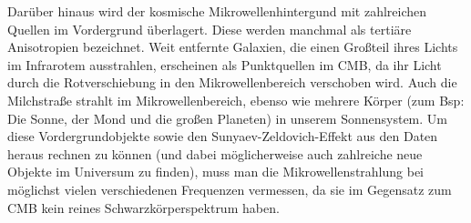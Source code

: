 \documentclass[10pt,a4paper]{article}
\begin{document}
Darüber hinaus wird der kosmische Mikrowellenhintergund mit zahlreichen Quellen im Vordergrund überlagert. Diese werden manchmal als tertiäre Anisotropien bezeichnet.\cite{Tegmark}
Weit entfernte Galaxien, die einen Großteil ihres Lichts im Infrarotem ausstrahlen, erscheinen als Punktquellen im CMB, da ihr Licht durch die Rotverschiebung in den Mikrowellenbereich verschoben wird. Auch die Milchstraße strahlt im Mikrowellenbereich, ebenso wie mehrere Körper (zum Bsp: Die Sonne, der Mond und die großen Planeten) in unserem Sonnensystem.
Um diese Vordergrundobjekte sowie den Sunyaev-Zeldovich-Effekt aus den Daten heraus rechnen zu können (und dabei möglicherweise auch zahlreiche neue Objekte im Universum zu finden), muss man die Mikrowellenstrahlung bei möglichst vielen verschiedenen Frequenzen vermessen, da sie im Gegensatz zum CMB kein reines Schwarzkörperspektrum haben.\cite{A+R}
\end{document}
